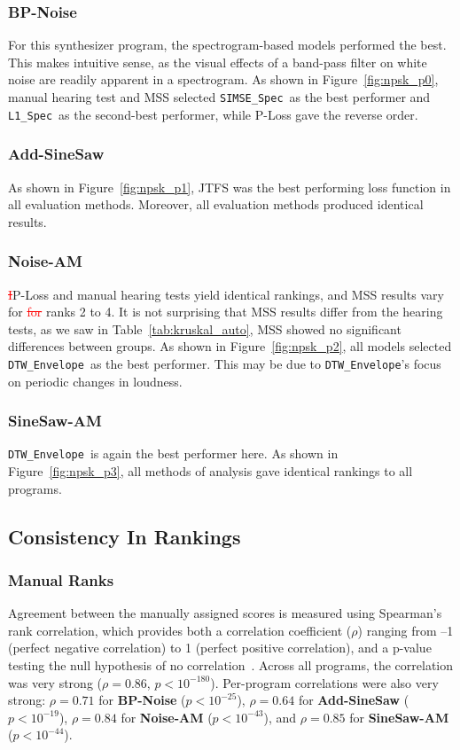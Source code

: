 \documentclass[lettersize,journal]{IEEEtran}
\makeatletter
\renewcommand{\DIFdel}[1]{\textcolor{red}{\sout{#1}}}
\newcommand{\SIMSESpec}{\texttt{SIMSE\_Spec}}
\newcommand{\LoneSpec}{\texttt{L1\_Spec}}
\newcommand{\DTWEnv}{\texttt{DTW\_Envelope}}
\newcommand{\BPNoise}{\textbf{BP-Noise}}
\newcommand{\AddSineSaw}{\textbf{Add-SineSaw}}
\newcommand{\AmpMod}{\textbf{Noise-AM}}
\newcommand{\FMMod}{\textbf{SineSaw-AM}}
\providecommand{\DIFdel}[1]{{\protect\color{red}\sout{#1}}} %
\providecommand{\DIFdelbegin}{} %
\providecommand{\DIFdelend}{} %
\providecommand{\DIFscaledelfig}{0.5}
\newlength{\DIFdelgraphicswidth} %
\newlength{\DIFdelgraphicsheight} %
\providecommand{\DIFdelincludegraphics}[2][]{%
\sbox{\DIFdelgraphicsbox}{\DIFOincludegraphics[#1]{#2}}%
\settoboxwidth{\DIFdelgraphicswidth}{\DIFdelgraphicsbox} %
\settoboxtotalheight{\DIFdelgraphicsheight}{\DIFdelgraphicsbox} %
\scalebox{\DIFscaledelfig}{%
\parbox[b]{\DIFdelgraphicswidth}{\usebox{\DIFdelgraphicsbox}\\[-\baselineskip] \rule{\DIFdelgraphicswidth}{0em}}\llap{\resizebox{\DIFdelgraphicswidth}{\DIFdelgraphicsheight}{%
\setlength{\unitlength}{\DIFdelgraphicswidth}%
\begin{picture}(1,1)%
\thicklines\linethickness{2pt} %
{\color[rgb]{1,0,0}\put(0,0){\framebox(1,1){}}}%
{\color[rgb]{1,0,0}\put(0,0){\line( 1,1){1}}}%
{\color[rgb]{1,0,0}\put(0,1){\line(1,-1){1}}}%
\end{picture}%
}\hspace*{3pt}}} %
} %
\DeclareRobustCommand{\DIFdelbegin}{\DIFOdelbegin \let\includegraphics\DIFdelincludegraphics} %
\DeclareRobustCommand{\DIFdelend}{\DIFOaddend \let\includegraphics\DIFOincludegraphics} %
\let\sout@orig\sout %
\renewcommand{\sout}[1]{\ifmmode\text{\sout@orig{\ensuremath{#1}}}\else\sout@orig{#1}\fi} %
\makeatother
\begin{document}
\subsubsection{\BPNoise}
For this synthesizer program, the spectrogram-based models performed the best. This makes intuitive sense, as the visual effects of a band-pass filter on white noise are readily apparent in a spectrogram. As shown in Figure~\ref{fig:npsk_p0}, manual hearing test and MSS selected \SIMSESpec~as the best performer and \LoneSpec~as the second-best performer, while P-Loss gave the reverse order. 


\subsubsection{\AddSineSaw}
As shown in Figure~\ref{fig:npsk_p1}, JTFS was the best performing loss function in all evaluation methods. Moreover, all evaluation methods produced identical results. 

\subsubsection{\AmpMod}
\DIFdelbegin \DIFdel{I}\DIFdelend P-Loss  and manual hearing tests yield identical rankings, and MSS results vary for \DIFdelbegin \DIFdel{for }\DIFdelend ranks 2 to 4. It is not surprising that MSS results differ from the hearing tests, as we saw in Table~\ref{tab:kruskal_auto}, MSS showed no significant differences between groups. As shown in Figure~\ref{fig:npsk_p2}, all models selected \DTWEnv~as the best performer. This may be due to \DTWEnv's focus on periodic changes in loudness.

\subsubsection{\FMMod}
\DTWEnv~is again the best performer here. As shown in Figure~\ref{fig:npsk_p3}, all methods of analysis gave identical rankings to all programs.


\subsection{Consistency In Rankings}
\label{sec:consistency_in_rankings}
\subsubsection{Manual Ranks} Agreement between the manually assigned scores is measured using Spearman’s rank correlation, which provides both a correlation coefficient ($\rho$) ranging from –1 (perfect negative correlation) to 1 (perfect positive correlation), and a p-value testing the null hypothesis of no correlation~\cite{spearman1987proof,rebekic2015pearson}. Across all programs, the correlation was very strong ($\rho = 0.86$, $p < 10^{-180}$). Per-program correlations were also very strong: $\rho = 0.71$ for \BPNoise{} ($p < 10^{-25}$), $\rho = 0.64$ for \AddSineSaw{} ($p < 10^{-19}$), $\rho = 0.84$ for \AmpMod{} ($p < 10^{-43}$), and $\rho = 0.85$ for \FMMod{} ($p < 10^{-44}$). 
\end{document}
